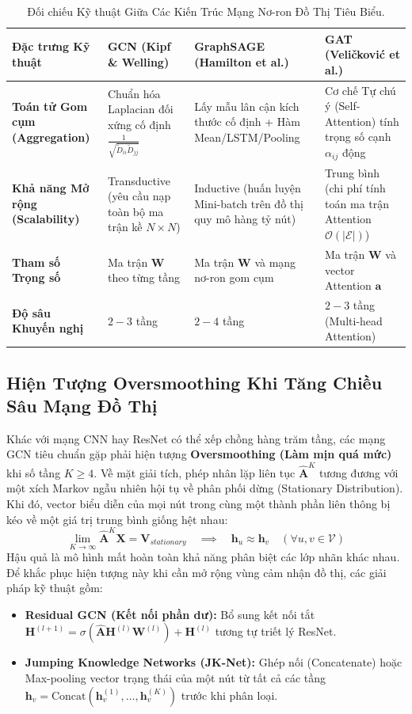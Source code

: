 \documentclass[12pt,a4paper]{report}
\begin{document}
\begin{table}[H]
\centering
\small
\caption{Đối chiếu Kỹ thuật Giữa Các Kiến Trúc Mạng Nơ-ron Đồ Thị Tiêu Biểu.}
\label{tab:gnn_comparison}
\begin{tabularx}{\linewidth}{L{2.5cm} Y Y Y}
\toprule
\textbf{Đặc trưng Kỹ thuật} & \textbf{GCN (Kipf \& Welling)} & \textbf{GraphSAGE (Hamilton et al.)} & \textbf{GAT (Veličković et al.)} \\
\midrule
\textbf{Toán tử Gom cụm (Aggregation)} & Chuẩn hóa Laplacian đối xứng cố định $\frac{1}{\sqrt{\tilde{D}_{ii} \tilde{D}_{jj}}}$ & Lấy mẫu lân cận kích thước cố định + Hàm Mean/LSTM/Pooling & Cơ chế Tự chú ý (Self-Attention) tính trọng số cạnh $\alpha_{ij}$ động \\
\textbf{Khả năng Mở rộng (Scalability)} & Transductive (yêu cầu nạp toàn bộ ma trận kề $N \times N$) & Inductive (huấn luyện Mini-batch trên đồ thị quy mô hàng tỷ nút) & Trung bình (chi phí tính toán ma trận Attention $\mathcal{O}(|\mathcal{E}|)$) \\
\textbf{Tham số Trọng số} & Ma trận $\mathbf{W}$ theo từng tầng & Ma trận $\mathbf{W}$ và mạng nơ-ron gom cụm & Ma trận $\mathbf{W}$ và vector Attention $\mathbf{a}$ \\
\textbf{Độ sâu Khuyến nghị} & $2 - 3$ tầng & $2 - 4$ tầng & $2 - 3$ tầng (Multi-head Attention) \\
\bottomrule
\end{tabularx}
\end{table}

\subsection{Hiện Tượng Oversmoothing Khi Tăng Chiều Sâu Mạng Đồ Thị}
Khác với mạng CNN hay ResNet có thể xếp chồng hàng trăm tầng, các mạng GCN tiêu chuẩn gặp phải hiện tượng \textbf{Oversmoothing (Làm mịn quá mức)} khi số tầng $K \ge 4$. Về mặt giải tích, phép nhân lặp liên tục $\hat{\mathbf{A}}^K$ tương đương với một xích Markov ngẫu nhiên hội tụ về phân phối dừng (Stationary Distribution). Khi đó, vector biểu diễn của mọi nút trong cùng một thành phần liên thông bị kéo về một giá trị trung bình giống hệt nhau:
\begin{equation}
    \lim_{K \to \infty} \hat{\mathbf{A}}^K \mathbf{X} = \mathbf{V}_{stationary} \quad \implies \quad \mathbf{h}_u \approx \mathbf{h}_v \quad (\forall u, v \in \mathcal{V})
\end{equation}
Hậu quả là mô hình mất hoàn toàn khả năng phân biệt các lớp nhãn khác nhau. Để khắc phục hiện tượng này khi cần mở rộng vùng cảm nhận đồ thị, các giải pháp kỹ thuật gồm:
\begin{itemize}[leftmargin=1.2cm]
    \item \textbf{Residual GCN (Kết nối phần dư):} Bổ sung kết nối tắt $\mathbf{H}^{(l+1)} = \sigma(\hat{\mathbf{A}} \mathbf{H}^{(l)} \mathbf{W}^{(l)}) + \mathbf{H}^{(l)}$ tương tự triết lý ResNet.
    \item \textbf{Jumping Knowledge Networks (JK-Net):} Ghép nối (Concatenate) hoặc Max-pooling vector trạng thái của một nút từ tất cả các tầng $\mathbf{h}_v = \text{Concat}(\mathbf{h}_v^{(1)}, \dots, \mathbf{h}_v^{(K)})$ trước khi phân loại.
\end{itemize}
\end{document}
